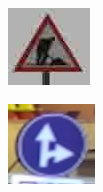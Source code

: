 \begin{figure}[h]
\begin{subfigure}[b]{0.15\linewidth}
    \includegraphics[width=\linewidth]{figures/signs/RoadWork.jpg}
    \caption{}
  \end{subfigure}
  \begin{subfigure}[b]{0.15\linewidth}
    \includegraphics[width=\linewidth]{figures/signs/StraightOrRight.jpg}
    \caption{}
  \end{subfigure}

\end{figure}
